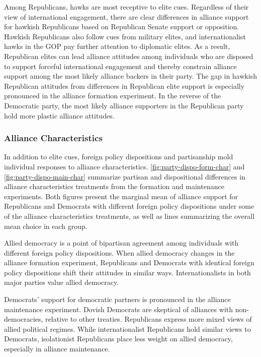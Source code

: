 \documentclass[12pt]{article}
\begin{document}
Among Republicans, hawks are most receptive to elite cues. 
Regardless of their view of international engagement, there are clear differences in alliance support for hawkish Republicans based on Republican Senate support or opposition.
Hawkish Republicans also follow cues from military elites, and internationalist hawks in the GOP pay further attention to diplomatic elites. 
As a result, Republican elites can lead alliance attitudes among individuals who are disposed to support forceful international engagement and thereby constrain alliance support among the most likely alliance backers in their party. 
The gap in hawkish Republican attitudes from differences in Republican elite support is especially pronounced in the alliance formation experiment. 
In the reverse of the Democratic party, the most likely alliance supporters in the Republican party hold more plastic alliance attitudes. 



\subsubsection{Alliance Characteristics}



In addition to elite cues, foreign policy dispositions and partisanship mold individual responses to alliance characteristics. 
\autoref{fig:party-dispo-form-char} and \autoref{fig:party-dispo-main-char} summarize partisan and dispositional differences in alliance characteristics treatments from the formation and maintenance experiments. 
Both figures present the marginal mean of alliance support for Republicans and Democrats with different foreign policy dispositions under some of the alliance characteristics treatments, as well as lines summarizing the overall mean choice in each group. 


Allied democracy is a point of bipartisan agreement among individuals with different foreign policy dispositions.
When allied democracy changes in the alliance formation experiment, Republicans and Democrats with identical foreign policy dispositions shift their attitudes in similar ways. 
Internationalists in both major parties value allied democracy. 


Democrats' support for democratic partners is pronounced in the alliance maintenance experiment. 
Dovish Democrats are skeptical of alliances with non-democracies, relative to other treaties. 
Republicans express more mixed views of allied political regimes. 
While internationalist Republicans hold similar views to Democrats, isolationist Republicans place less weight on allied democracy, especially in alliance maintenance. 
\end{document}
